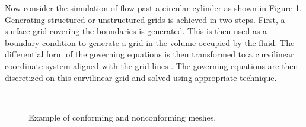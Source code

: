 Now consider the simulation of flow past a circular cylinder as shown in Figure \ref{fig:C1_conformalVSnonconformal}. Generating structured or unstructured grids is achieved in two steps. First, a surface grid covering the boundaries is generated. This is then used as a boundary condition to generate a grid in the volume occupied by the fluid. The differential form of the governing equations is then transformed to a curvilinear coordinate system aligned with the grid lines \cite{anderson1995computational}. The governing equations are then discretized on this curvilinear grid and solved using appropriate technique.
%
\begin{figure}[H]
	\centering
	\quad
	\\
	\quad
	\caption{Example of conforming and nonconforming meshes.}
	\label{fig:C1_conformalVSnonconformal}
\end{figure}
